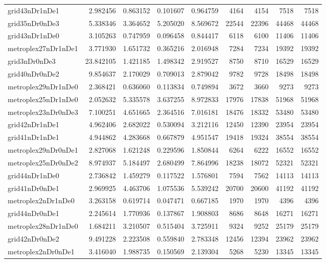 \begin{longtable}{|l|r|r|r|r|r|r|r|r|}
grid43nDr1nDe1 & 2.982456 & 0.863152 & 0.101607 & 0.964759 & 4164 & 4154 & 7518 & 7518 \\
grid35nDr0nDe3 & 5.338346 & 3.364652 & 5.205020 & 8.569672 & 22544 & 22396 & 44468 & 44468 \\
grid43nDr1nDe0 & 3.105263 & 0.747959 & 0.096458 & 0.844417 & 6118 & 6100 & 11406 & 11406 \\
metroplex27nDr1nDe1 & 3.771930 & 1.651732 & 0.365216 & 2.016948 & 7284 & 7234 & 19392 & 19392 \\
grid3nDr0nDe3 & 23.842105 & 1.421185 & 1.498342 & 2.919527 & 8750 & 8710 & 16529 & 16529 \\
grid40nDr0nDe2 & 9.854637 & 2.170029 & 0.709013 & 2.879042 & 9782 & 9728 & 18498 & 18498 \\
metroplex29nDr1nDe0 & 2.368421 & 0.636060 & 0.113834 & 0.749894 & 3672 & 3660 & 9273 & 9273 \\
metroplex25nDr1nDe0 & 2.052632 & 5.335578 & 3.637255 & 8.972833 & 17976 & 17838 & 51968 & 51968 \\
metroplex23nDr0nDe3 & 7.100251 & 4.651665 & 2.364516 & 7.016181 & 18476 & 18332 & 53480 & 53480 \\
grid42nDr1nDe1 & 4.962406 & 2.682022 & 0.530094 & 3.212116 & 12450 & 12390 & 23954 & 23954 \\
grid41nDr1nDe1 & 4.944862 & 4.283668 & 0.667879 & 4.951547 & 19418 & 19324 & 38554 & 38554 \\
metroplex29nDr0nDe1 & 2.827068 & 1.621248 & 0.229596 & 1.850844 & 6264 & 6222 & 16552 & 16552 \\
metroplex25nDr0nDe2 & 8.974937 & 5.184497 & 2.680499 & 7.864996 & 18238 & 18072 & 52321 & 52321 \\
grid44nDr1nDe0 & 2.736842 & 1.459279 & 0.117522 & 1.576801 & 7594 & 7562 & 14113 & 14113 \\
grid41nDr0nDe1 & 2.969925 & 4.463706 & 1.075536 & 5.539242 & 20700 & 20600 & 41192 & 41192 \\
metroplex2nDr1nDe0 & 3.263158 & 0.619714 & 0.047471 & 0.667185 & 1970 & 1970 & 4396 & 4396 \\
grid44nDr0nDe1 & 2.245614 & 1.770936 & 0.137867 & 1.908803 & 8686 & 8648 & 16271 & 16271 \\
metroplex28nDr1nDe0 & 1.684211 & 3.210507 & 0.515404 & 3.725911 & 9324 & 9252 & 25179 & 25179 \\
grid42nDr0nDe2 & 9.491228 & 2.223508 & 0.559840 & 2.783348 & 12456 & 12394 & 23962 & 23962 \\
metroplex2nDr0nDe1 & 3.416040 & 1.988735 & 0.150569 & 2.139304 & 5268 & 5230 & 13345 & 13345 \\

\end{longtable}
